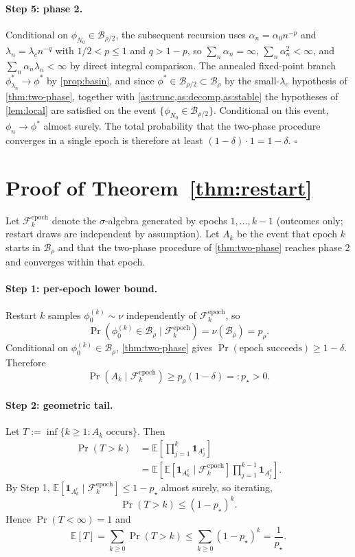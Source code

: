\documentclass{article}
\theoremstyle{plain}
\theoremstyle{definition}
\theoremstyle{remark}
\newcommand{\E}{\mathbb{E}}
\newcommand{\B}{\mathcal{B}}
\newcommand{\F}{\mathcal{F}}
\begin{document}
\paragraph{Step 5: phase 2.}
Conditional on $\phi_{N_0}\in\B_{\rho/2}$, the subsequent recursion uses $\alpha_n=\alpha_0 n^{-p}$ and $\lambda_n=\lambda_c n^{-q}$ with $1/2<p\le 1$ and $q>1-p$, so $\sum_n\alpha_n=\infty$, $\sum_n\alpha_n^2<\infty$, and $\sum_n\alpha_n\lambda_n<\infty$ by direct integral comparison. The annealed fixed-point branch $\phi^\ast_{\lambda_n}\to\phi^\ast$ by \cref{prop:basin}, and since $\phi^\ast\in\B_{\rho/2}\subset\B_\rho$ by the small-$\lambda_c$ hypothesis of \cref{thm:two-phase}, together with \cref{as:trunc,as:decomp,as:stable} the hypotheses of \cref{lem:local} are satisfied on the event $\{\phi_{N_0}\in\B_{\rho/2}\}$. Conditional on this event, $\phi_n\to\phi^\ast$ almost surely. The total probability that the two-phase procedure converges in a single epoch is therefore at least $(1-\delta)\cdot 1=1-\delta$. $\square$

\section{Proof of Theorem~\ref{thm:restart}}\label{app:thm-restart}

Let $\F_k^{\mathrm{epoch}}$ denote the $\sigma$-algebra generated by epochs $1,\ldots,k-1$ (outcomes only; restart draws are independent by assumption). Let $A_k$ be the event that epoch $k$ starts in $\B_\rho$ and that the two-phase procedure of \cref{thm:two-phase} reaches phase 2 and converges within that epoch.

\paragraph{Step 1: per-epoch lower bound.}
Restart $k$ samples $\phi_0^{(k)}\sim\nu$ independently of $\F_k^{\mathrm{epoch}}$, so
\[
\Pr(\phi_0^{(k)}\in\B_\rho\mid\F_k^{\mathrm{epoch}})=\nu(\B_\rho)=p_\rho.
\]
Conditional on $\phi_0^{(k)}\in\B_\rho$, \cref{thm:two-phase} gives $\Pr(\text{epoch succeeds})\ge 1-\delta$. Therefore
\[
\Pr(A_k\mid\F_k^{\mathrm{epoch}})\ge p_\rho(1-\delta)=:p_\star>0.
\]

\paragraph{Step 2: geometric tail.}
Let $T:=\inf\{k\ge 1:A_k\text{ occurs}\}$. Then
\[
\begin{aligned}
\Pr(T>k)
&=\E\!\left[\prod_{j=1}^k\mathbf{1}_{A_j^c}\right]\\
&=\E\!\left[
\E[\mathbf{1}_{A_k^c}\mid\F_k^{\mathrm{epoch}}]
\prod_{j=1}^{k-1}\mathbf{1}_{A_j^c}\right].
\end{aligned}
\]
By Step 1, $\E[\mathbf{1}_{A_k^c}\mid\F_k^{\mathrm{epoch}}]\le 1-p_\star$ almost surely, so iterating,
\[
\Pr(T>k)\le (1-p_\star)^k.
\]
Hence $\Pr(T<\infty)=1$ and
\[
\E[T]=\sum_{k\ge 0}\Pr(T>k)\le \sum_{k\ge 0}(1-p_\star)^k=\frac{1}{p_\star}.
\]
\end{document}
